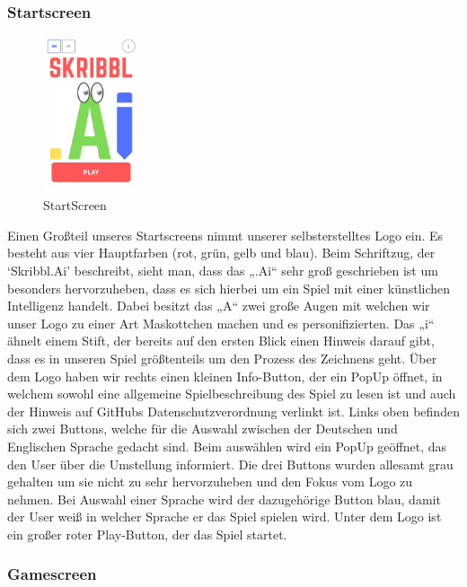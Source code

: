 \documentclass[11pt]{article}
\begin{document}
\subsubsection{Startscreen}

\begin{figure}
\centering
\includegraphics[width=0.25\textwidth]{images/Startscreen.jpg}
\caption{\label{fig:Startscreen}StartScreen}
\end{figure}

Einen Großteil unseres Startscreens nimmt unserer selbsterstelltes Logo ein. Es besteht aus vier Hauptfarben (rot, grün, gelb und blau). Beim Schriftzug, der ‘Skribbl.Ai’ beschreibt, sieht man, dass das „.Ai“ sehr groß geschrieben ist um besonders hervorzuheben, dass es sich hierbei um ein Spiel mit einer künstlichen Intelligenz handelt. Dabei besitzt das „A“ zwei große Augen mit welchen wir unser Logo zu einer Art Maskottchen machen und es personifizierten. Das „i“ ähnelt einem Stift, der bereits auf den ersten Blick einen Hinweis darauf gibt, dass es in unseren Spiel größtenteils um den Prozess des Zeichnens geht. 
Über dem Logo haben wir rechts einen kleinen Info-Button, der ein PopUp öffnet, in welchem sowohl eine allgemeine Spielbeschreibung des Spiel zu lesen ist und auch der Hinweis auf GitHubs Datenschutzverordnung verlinkt ist. 
Links oben befinden sich zwei Buttons, welche für die Auswahl zwischen der Deutschen und Englischen Sprache gedacht sind. 
Beim auswählen wird ein PopUp geöffnet, das den User über die Umstellung informiert. Die drei Buttons wurden allesamt grau gehalten um sie nicht zu sehr hervorzuheben und den Fokus vom Logo zu nehmen. Bei Auswahl einer Sprache wird der dazugehörige Button blau, damit der User weiß in welcher Sprache er das Spiel spielen wird. 
Unter dem Logo ist ein großer roter Play-Button, der das Spiel startet.

\subsubsection{Gamescreen}
\end{document}
